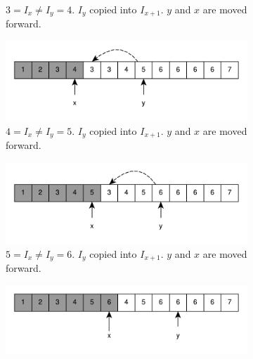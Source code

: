 \begin{figure}
\begin{subfigure}[t]{0.49\textwidth}
		\vspace*{-8mm}
		\caption{$3 = I_x \neq I_y = 4$. $I_y$ copied into $I_{x+1}$. $y$ and $x$ are moved forward.}
		\label{fig:remove_duplicated_sorted_array_inplace:example1_6}
	 \end{subfigure}
	 \hfill
	 \begin{subfigure}[t]{0.49\textwidth}
		\includegraphics[width=1\linewidth]{sources/remove_duplicated_sorted_array_inplace/images/example1_8}
		\vspace*{-8mm}
		\caption{$4 = I_x \neq I_y = 5$. $I_y$ copied into $I_{x+1}$. $y$ and $x$ are moved forward.}
		\label{fig:remove_duplicated_sorted_array_inplace:example1_6}
	 \end{subfigure}
	 \hfill
	 \begin{subfigure}[t]{0.49\textwidth}
		\includegraphics[width=1\linewidth]{sources/remove_duplicated_sorted_array_inplace/images/example1_10}
		\vspace*{-8mm}
		\caption{$5 = I_x \neq I_y = 6$. $I_y$ copied into $I_{x+1}$. $y$ and $x$ are moved forward.}
		\label{fig:remove_duplicated_sorted_array_inplace:example1_6}
	 \end{subfigure}
	 \hfill
	 \begin{subfigure}[t]{0.49\textwidth}
		\includegraphics[width=1\linewidth]{sources/remove_duplicated_sorted_array_inplace/images/example1_11}

\end{subfigure}
\end{figure}
